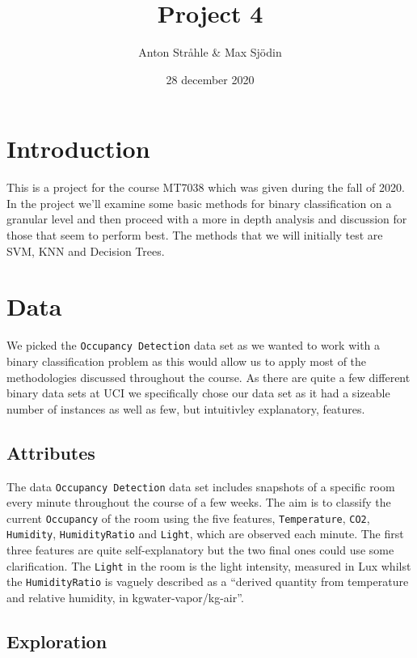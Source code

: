 \documentclass[
]{article}
\title{Project 4}
\author{Anton Stråhle \& Max Sjödin}
\date{28 december 2020}
\begin{document}
\maketitle

\hypertarget{introduction}{%
\section{Introduction}\label{introduction}}

This is a project for the course MT7038 which was given during the fall
of 2020. In the project we'll examine some basic methods for binary
classification on a granular level and then proceed with a more in depth
analysis and discussion for those that seem to perform best. The methods
that we will initially test are SVM, KNN and Decision Trees.

\hypertarget{data}{%
\section{Data}\label{data}}

We picked the \texttt{Occupancy\ Detection} data set as we wanted to
work with a binary classification problem as this would allow us to
apply most of the methodologies discussed throughout the course. As
there are quite a few different binary data sets at UCI we specifically
chose our data set as it had a sizeable number of instances as well as
few, but intuitivley explanatory, features.

\hypertarget{attributes}{%
\subsection{Attributes}\label{attributes}}

The data \texttt{Occupancy\ Detection} data set includes snapshots of a
specific room every minute throughout the course of a few weeks. The aim
is to classify the current \texttt{Occupancy} of the room using the five
features, \texttt{Temperature}, \texttt{CO2}, \texttt{Humidity},
\texttt{HumidityRatio} and \texttt{Light}, which are observed each
minute. The first three features are quite self-explanatory but the two
final ones could use some clarification. The \texttt{Light} in the room
is the light intensity, measured in Lux whilst the
\texttt{HumidityRatio} is vaguely described as a ``derived quantity from
temperature and relative humidity, in kgwater-vapor/kg-air''.

\hypertarget{exploration}{%
\subsection{Exploration}\label{exploration}}
\end{document}
